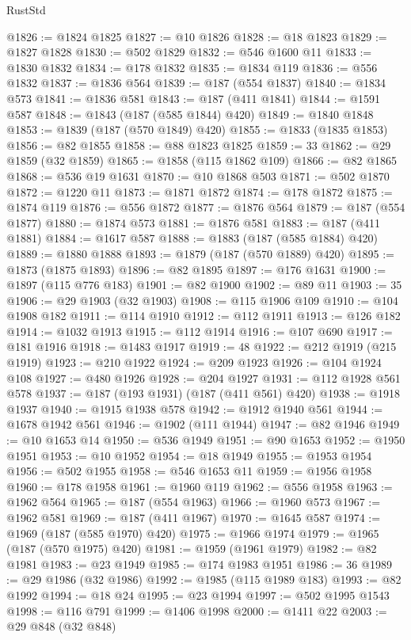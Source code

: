 \begin{lexlean}{RustStd}
\begin{coremodule}
{\begin{coremodule}
{{{{{{{{{{{{{{{{{{{{{{{{{{{{{{{{{{{{{{{{{{{{{{{{{{{{{{{@1826 := @1824 @1825
@1827 := @10 @1826
@1828 := @18 @1823
@1829 := @1827 @1828
@1830 := @502 @1829
@1832 := @546 @1600 @11
@1833 := @1830 @1832
@1834 := @178 @1832
@1835 := @1834 @119
@1836 := @556 @1832
@1837 := @1836 @564
@1839 := @187 (@554 @1837)
@1840 := @1834 @573
@1841 := @1836 @581
@1843 := @187 (@411 @1841)
@1844 := @1591 @587
@1848 := @1843 (@187 (@585 @1844) @420)
@1849 := @1840 @1848
@1853 := @1839 (@187 (@570 @1849) @420)
@1855 := @1833 (@1835 @1853)
@1856 := @82 @1855
@1858 := @88 @1823 @1825
@1859 := 33
@1862 := @29 @1859 (@32 @1859)
@1865 := @1858 (@115 @1862 @109)
@1866 := @82 @1865
@1868 := @536 @19 @1631
@1870 := @10 @1868 @503
@1871 := @502 @1870
@1872 := @1220 @11
@1873 := @1871 @1872
@1874 := @178 @1872
@1875 := @1874 @119
@1876 := @556 @1872
@1877 := @1876 @564
@1879 := @187 (@554 @1877)
@1880 := @1874 @573
@1881 := @1876 @581
@1883 := @187 (@411 @1881)
@1884 := @1617 @587
@1888 := @1883 (@187 (@585 @1884) @420)
@1889 := @1880 @1888
@1893 := @1879 (@187 (@570 @1889) @420)
@1895 := @1873 (@1875 @1893)
@1896 := @82 @1895
@1897 := @176 @1631
@1900 := @1897 (@115 @776 @183)
@1901 := @82 @1900
@1902 := @89 @11
@1903 := 35
@1906 := @29 @1903 (@32 @1903)
@1908 := @115 @1906 @109
@1910 := @104 @1908 @182
@1911 := @114 @1910
@1912 := @112 @1911
@1913 := @126 @182
@1914 := @1032 @1913
@1915 := @112 @1914
@1916 := @107 @690
@1917 := @181 @1916
@1918 := @1483 @1917
@1919 := 48
@1922 := @212 @1919 (@215 @1919)
@1923 := @210 @1922
@1924 := @209 @1923
@1926 := @104 @1924 @108
@1927 := @480 @1926
@1928 := @204 @1927
@1931 := @112 @1928 @561 @578
@1937 := @187 (@193 @1931) (@187 (@411 @561) @420)
@1938 := @1918 @1937
@1940 := @1915 @1938 @578
@1942 := @1912 @1940 @561
@1944 := @1678 @1942 @561
@1946 := @1902 (@111 @1944)
@1947 := @82 @1946
@1949 := @10 @1653 @14
@1950 := @536 @1949
@1951 := @90 @1653
@1952 := @1950 @1951
@1953 := @10 @1952
@1954 := @18 @1949
@1955 := @1953 @1954
@1956 := @502 @1955
@1958 := @546 @1653 @11
@1959 := @1956 @1958
@1960 := @178 @1958
@1961 := @1960 @119
@1962 := @556 @1958
@1963 := @1962 @564
@1965 := @187 (@554 @1963)
@1966 := @1960 @573
@1967 := @1962 @581
@1969 := @187 (@411 @1967)
@1970 := @1645 @587
@1974 := @1969 (@187 (@585 @1970) @420)
@1975 := @1966 @1974
@1979 := @1965 (@187 (@570 @1975) @420)
@1981 := @1959 (@1961 @1979)
@1982 := @82 @1981
@1983 := @23 @1949
@1985 := @174 @1983 @1951
@1986 := 36
@1989 := @29 @1986 (@32 @1986)
@1992 := @1985 (@115 @1989 @183)
@1993 := @82 @1992
@1994 := @18 @24
@1995 := @23 @1994
@1997 := @502 @1995 @1543
@1998 := @116 @791
@1999 := @1406 @1998
@2000 := @1411 @22
@2003 := @29 @848 (@32 @848)
}}}}}}}}}}}}}}}}}}}}}}}}}}}}}}}}}}}}}}}}}}}}}}}}}}}}}}}
\end{coremodule}}
\end{coremodule}
\end{lexlean}
